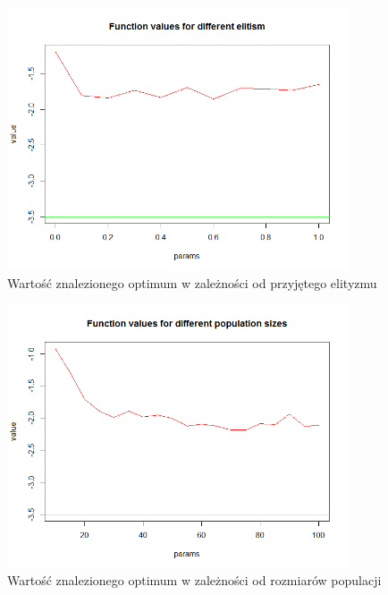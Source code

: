 \documentclass[11pt, a4paper]{article}
\begin{document}
\begin{figure}[H]
	\begin{center}
		\includegraphics[width=0.9\textwidth]{./assets/Zeldasine4.png} %
		\caption{Wartość znalezionego optimum w zależności od przyjętego elityzmu}
		\label{fig:gulf7}
	\end{center}
\end{figure}
\begin{figure}[H]
	\begin{center}
		\includegraphics[width=0.9\textwidth]{./assets/Zeldasine5.png} %
		\caption{Wartość znalezionego optimum w zależności od rozmiarów populacji}
		\label{fig:gulf7}
	\end{center}
\end{figure}
\end{document}
